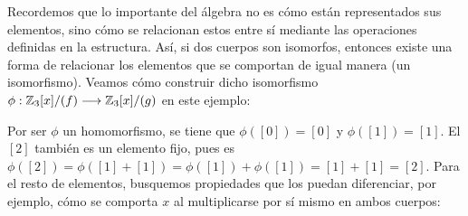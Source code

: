 \begin{Revision}
\begin{ejs}
        Recordemos que lo importante del álgebra no es cómo están representados sus elementos, sino cómo se relacionan estos entre sí mediante las operaciones definidas en la estructura. Así, si dos cuerpos son isomorfos, entonces existe una forma de relacionar los elementos que se comportan de igual manera (un isomorfismo). Veamos cómo construir dicho isomorfismo $\phi: \mathbb{Z}_3[x]/(f) \longrightarrow \mathbb{Z}_3[x]/(g)$ en este ejemplo:
        
        Por ser $\phi$ un homomorfismo, se tiene que $\phi([0]) = [0]$ y $\phi([1]) = [1]$. El $[2]$ también es un elemento fijo, pues es $\phi([2]) = \phi([1] + [1]) =\phi([1]) +\phi([1]) = [1] + [1] = [2]$. Para el resto de elementos, busquemos propiedades que los puedan diferenciar, por ejemplo, cómo se comporta $x$ al multiplicarse por sí mismo en ambos cuerpos: 
    

\end{ejs}
\end{Revision}
